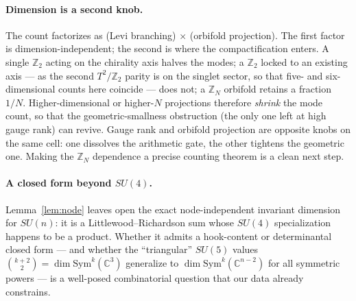 \documentclass[11pt,a4paper]{article}
\newcommand{\ZZ}{\mathbb{Z}}
\begin{document}
\paragraph{Dimension is a second knob.} The count factorizes as (Levi branching) $\times$
(orbifold projection). The first factor is dimension-independent; the second is where the
compactification enters. A single $\ZZ_2$ acting on the chirality axis halves the modes; a
$\ZZ_2$ locked to an existing axis --- as the second $T^2/\mathbb{Z}_2$ parity is on the
singlet sector, so that five- and six-dimensional counts here coincide --- does not; a
$\ZZ_N$ orbifold retains a fraction $1/N$. Higher-dimensional or higher-$N$ projections
therefore \emph{shrink} the mode count, so that the geometric-smallness obstruction (the
only one left at high gauge rank) can revive. Gauge rank and orbifold projection are
opposite knobs on the same cell: one dissolves the arithmetic gate, the other tightens the
geometric one. Making the $\ZZ_N$ dependence a precise counting theorem is a clean next step.

\paragraph{A closed form beyond $SU(4)$.} Lemma~\ref{lem:node} leaves open the exact
node-independent invariant dimension for $SU(n)$: it is a Littlewood--Richardson sum whose
$SU(4)$ specialization happens to be a product. Whether it admits a hook-content or
determinantal closed form --- and whether the ``triangular'' $SU(5)$ values
$\binom{k+2}{2}=\dim\mathrm{Sym}^k(\mathbb C^{3})$ generalize to
$\dim\mathrm{Sym}^k(\mathbb C^{n-2})$ for all symmetric powers --- is a well-posed
combinatorial question that our data already constrains.

\end{document}
